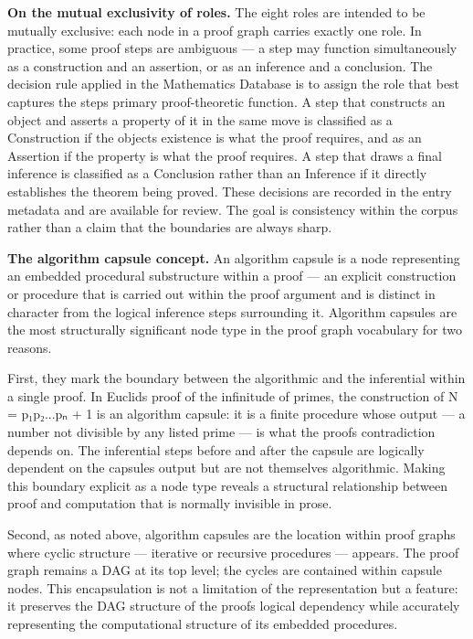 \documentclass[
  11pt]{article}
\begin{document}
\textbf{On the mutual exclusivity of roles.} The eight roles are
intended to be mutually exclusive: each node in a proof graph carries
exactly one role. In practice, some proof steps are ambiguous --- a step
may function simultaneously as a construction and an assertion, or as an
inference and a conclusion. The decision rule applied in the Mathematics
Database is to assign the role that best captures the
step\textquotesingle s primary proof-theoretic function. A step that
constructs an object and asserts a property of it in the same move is
classified as a Construction if the object\textquotesingle s existence
is what the proof requires, and as an Assertion if the property is what
the proof requires. A step that draws a final inference is classified as
a Conclusion rather than an Inference if it directly establishes the
theorem being proved. These decisions are recorded in the entry metadata
and are available for review. The goal is consistency within the corpus
rather than a claim that the boundaries are always sharp.

\textbf{The algorithm capsule concept.} An algorithm capsule is a node
representing an embedded procedural substructure within a proof --- an
explicit construction or procedure that is carried out within the proof
argument and is distinct in character from the logical inference steps
surrounding it. Algorithm capsules are the most structurally significant
node type in the proof graph vocabulary for two reasons.

First, they mark the boundary between the algorithmic and the
inferential within a single proof. In Euclid\textquotesingle s proof of
the infinitude of primes, the construction of N = p₁p₂...pₙ + 1 is an
algorithm capsule: it is a finite procedure whose output --- a number
not divisible by any listed prime --- is what the
proof\textquotesingle s contradiction depends on. The inferential steps
before and after the capsule are logically dependent on the
capsule\textquotesingle s output but are not themselves algorithmic.
Making this boundary explicit as a node type reveals a structural
relationship between proof and computation that is normally invisible in
prose.

Second, as noted above, algorithm capsules are the location within proof
graphs where cyclic structure --- iterative or recursive procedures ---
appears. The proof graph remains a DAG at its top level; the cycles are
contained within capsule nodes. This encapsulation is not a limitation
of the representation but a feature: it preserves the DAG structure of
the proof\textquotesingle s logical dependency while accurately
representing the computational structure of its embedded procedures.
\end{document}
